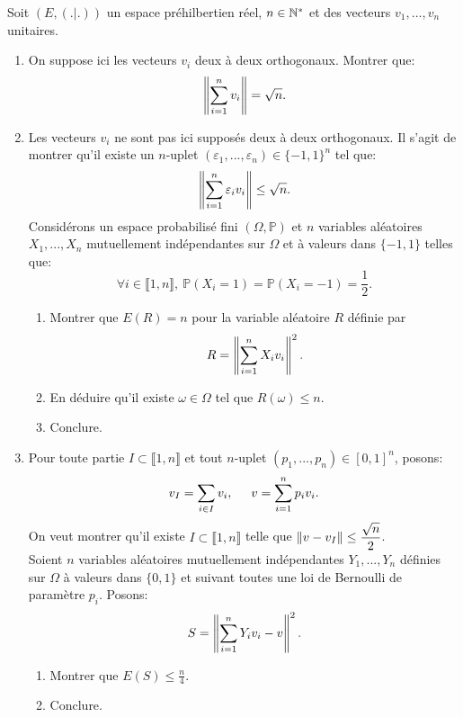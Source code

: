 Soit $(E,(.|.))$ un espace préhilbertien réel, $n\in \mathbb{N}^{*}$ et des vecteurs $v_{1},...,v_{n}$ unitaires.
\begin{enumerate}
  \item On suppose ici les vecteurs $v_{i}$ deux à deux orthogonaux. Montrer que:
  $$\left\Vert\sum_{i=1}^{n}v_{i}\right\Vert=\sqrt{n}.$$
  
  \item Les vecteurs $v_{i}$ ne sont pas ici supposés deux à deux orthogonaux. Il s'agit de montrer qu'il existe un $n$-uplet $(\varepsilon_{1},...,\varepsilon_{n})\in \{ -1,1 \}^{n}$ tel que:
  $$\left\Vert\sum_{i=1}^{n}\varepsilon_{i}v_{i}\right\Vert\leq \sqrt{n}.$$
  Considérons un espace probabilisé fini $(\Omega, \mathbb{P})$ et $n$ variables aléatoires $X_{1},...,X_{n}$ mutuellement indépendantes sur $\Omega$ et à valeurs dans $\{-1,1 \}$ telles que:
  $$\forall i\in \llbracket 1,n\rrbracket ,\ \mathbb{P}(X_{i} = 1) = \mathbb{P}(X_{i}=-1) = \frac{1}{2}.$$
  \begin{enumerate}
   \item Montrer que $E(R) = n$ pour la variable aléatoire $R$ définie par
\begin{displaymath}
  R = \left\Vert\sum_{i=1}^{n}X_{i}v_{i}\right\Vert^{2}.
\end{displaymath}

   \item En déduire qu'il existe $\omega \in \Omega$ tel que $R(\omega)\leq n$. 
   \item Conclure.
  \end{enumerate}
  
  \item Pour toute partie $I\subset \llbracket 1, n\rrbracket$ et tout $n$-uplet $(p_{1},...,p_{n})\in [0,1]^n$, posons:
\begin{displaymath}
v_{I} = \sum_{i\in I}v_{i},\hspace{0.5cm} v = \sum_{i=1}^{n}p_{i}v_{i}. 
\end{displaymath}
On veut montrer qu'il existe $I\subset \llbracket 1, n\rrbracket$ telle que $\left\Vert v-v_{I}\right\Vert\leq \displaystyle{\frac{\sqrt{n}}{2}}$. \\
Soient $n$ variables aléatoires mutuellement indépendantes $Y_{1},...,Y_{n}$ définies sur $\Omega$ à valeurs dans $\{ 0, 1 \}$ et suivant toutes une loi de Bernoulli de paramètre $p_{i}$. Posons:
     $$S = \left\Vert\sum_{i=1}^{n}Y_{i}v_{i}-v\right\Vert^{2}.$$
    \begin{enumerate}
     \item Montrer que $\displaystyle{E(S) \leq \frac{n}{4}}$.
     \item Conclure. 
    \end{enumerate}
\end{enumerate}
